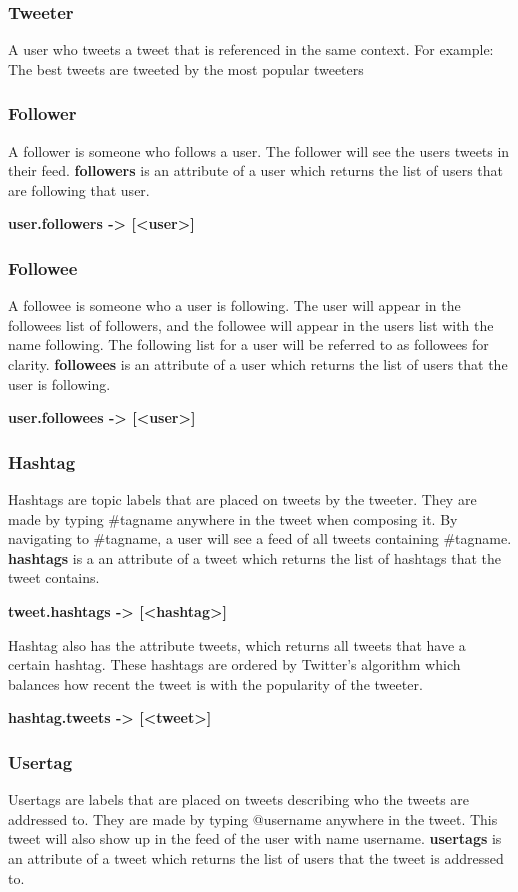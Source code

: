 \subsubsection{Tweeter}
A user who tweets a tweet that is referenced in the same context. For example: The best tweets are tweeted by the most popular tweeters


\subsubsection{Follower}
A follower is someone who follows a user. The follower will see the users tweets in their feed. \textbf{followers} is an attribute of a user which returns the list of users that are following that user.

  \textbf{user.followers -> [<user>]}

\subsubsection{Followee}
A followee is someone who a user is following. The user will appear in the followees list of followers, and the followee will appear in the users list with the name following. The following list for a user will be referred to as followees for clarity. \textbf{followees} is an attribute of a user which returns the list of users that the user is following.

  \textbf{user.followees -> [<user>]}

\subsubsection{Hashtag}
Hashtags are topic labels that are placed on tweets by the tweeter. They are made by typing \#tagname anywhere in the tweet when composing it. By navigating to \#tagname, a user will see a feed of all tweets containing \#tagname. \textbf{hashtags} is a an attribute of a tweet which returns the list of hashtags that the tweet contains.

  \textbf{tweet.hashtags -> [<hashtag>]}

\noindent
Hashtag also has the attribute tweets, which returns all tweets that have a certain hashtag. These hashtags are ordered by Twitter's algorithm which balances how recent the tweet is with the popularity of the tweeter.

  \textbf{hashtag.tweets -> [<tweet>]}

\subsubsection{Usertag}
Usertags are labels that are placed on tweets describing who the tweets are addressed to. They are made by typing @username anywhere in the tweet. This tweet will also show up in the feed of the user with name username. \textbf{usertags} is an attribute of a tweet which returns the list of users that the tweet is addressed to.


